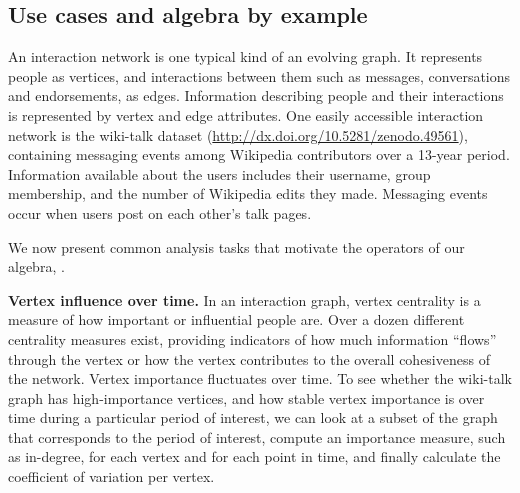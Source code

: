 \subsection{Use cases and algebra by example}
\label{sec:cases}

An interaction network is one typical kind of an evolving graph.  It
represents people as vertices, and interactions between them such as
messages, conversations and endorsements, as edges.  Information
describing people and their interactions is represented by vertex and
edge attributes.  One easily accessible interaction network is the
wiki-talk dataset (\url{http://dx.doi.org/10.5281/zenodo.49561}),
containing messaging events among Wikipedia contributors over a
13-year period.  Information available about the users includes their
username, group membership, and the number of Wikipedia edits they
made.  Messaging events occur when users post on each other's talk
pages.

We now present common analysis tasks that motivate the operators of
our algebra, \tga. 

{\bf Vertex influence over time.} In an interaction graph, vertex
centrality is a measure of how important or influential people are.
Over a dozen different centrality measures exist, providing indicators
of how much information ``flows'' through the vertex or how the vertex
contributes to the overall cohesiveness of the network.  Vertex
importance fluctuates over time.  To see whether the wiki-talk graph
has high-importance vertices, and how stable vertex importance is over
time during a particular period of interest, we can look at a subset
of the graph that corresponds to the period of interest, compute an
importance measure, such as in-degree, for each vertex and for each
point in time, and finally calculate the coefficient of variation per
vertex.


